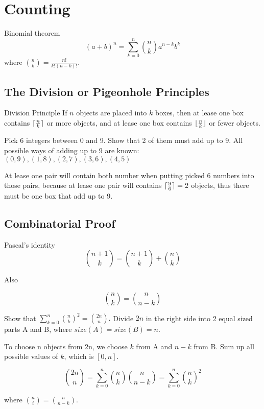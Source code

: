 \documentclass[10pt,a4paper]{article}
\DeclarePairedDelimiter\ceil{\lceil}{\rceil}
\DeclarePairedDelimiter\floor{\lfloor}{\rfloor}
\begin{document}
  \section{Counting}

  \begin{fact}{Binomial theorem}{}
    \[
    (a+b)^n = \sum_{k=0}^n \binom{n}{k} a^{n-k}b^k
    \]
    where $\binom{n}{k} = \frac{n!}{k!(n-k)!}$.
  \end{fact}

  \subsection{The Division or Pigeonhole Principles}

  \begin{fact}{Division Principle}{}
    If $n$ objects are placed into $k$ boxes,
    then at lease one box contains $\ceil{\frac{n}{k}}$ or more objects,
    and at lease one box contains $\floor{\frac{n}{k}}$ or fewer objects.
  \end{fact}

  \begin{exercise}{}{}
    Pick 6 integers between 0 and 9. Show that 2 of them must add up to 9.
    \tcblower
    All possible ways of adding up to 9 are known:
    $(0,9),(1,8),(2,7),(3,6),(4,5)$

    At lease one pair will contain both number when putting picked 6 numbers into those pairs, because at lease one pair will contains $\ceil{\frac{9}{6}}=2$ objects, thus there must be one box that add up to 9.
  \end{exercise}

  \subsection{Combinatorial Proof}

  \begin{fact}{Pascal’s identity}{}
    \[
    {n+1 \choose k} = {n+1 \choose k} + {n \choose k}
    \]
  \end{fact}

  Also

  \[
  {n \choose k} = {n \choose n-k}
  \]

  \begin{exercise}{}{}
    Show that $\sum_{k=0}^{n}{n \choose k}^2 = {2n \choose n}.$
    \tcblower
    Divide $2n$ in the right side into 2 equal sized parts A and B, where $size(A)=size(B)=n$.

    To choose n objects from 2n, we choose $k$ from A and $n-k$ from B.
    Sum up all possible values of $k$, which is $[0,n]$.

    \[
    {2n \choose n} = \sum_{k=0}^{n}{n \choose k}{n \choose n-k} = \sum_{k=0}^{n}{n \choose k}^2
    \]

    where ${n \choose i} = {n \choose n-k}$.
  \end{exercise}
\end{document}
